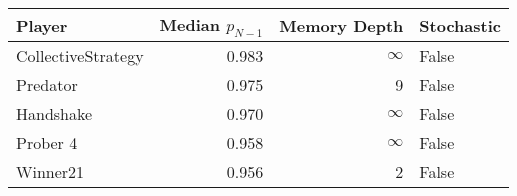 \begin{tabular}{lrrl}
\toprule
             Player &  Median $p_{N-1}$ &  Memory Depth & Stochastic \\
\midrule
 CollectiveStrategy &             0.983 &            \(\infty\) &      False \\
           Predator &             0.975 &             9 &      False \\
          Handshake &             0.970 &            \(\infty\) &      False \\
           Prober 4 &             0.958 &            \(\infty\) &      False \\
           Winner21 &             0.956 &             2 &      False \\
\bottomrule
\end{tabular}
